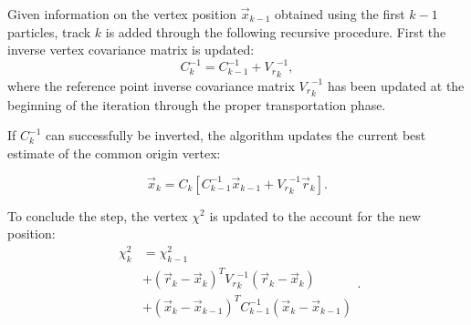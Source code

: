 Given information on the vertex position $\vec{x}_{k-1}$ obtained using the first $k-1$ particles, track $k$ is added through the following recursive procedure.
First the inverse vertex covariance matrix is updated:
\begin{equation}
C_k^{-1} = C_{k-1}^{-1} + {V_r}_k^{-1},
\end{equation}
where the reference point inverse covariance matrix ${V_r}_k^{-1}$ has been updated at the beginning of the iteration through the proper transportation phase.



If $C_k^{-1}$ can successfully be inverted, the algorithm updates the current best estimate of the common origin vertex:

\begin{equation}
\vec{x}_k = C_k \left[
	C_{k-1}^{-1} \vec{x}_{k-1}
	+ {V_r}_k^{-1} \vec{r}_k
\right].
\label{eq:VF_new_vertex_final}
\end{equation}

To conclude the step, the vertex $\chi^2$ is updated to the account for the new position:
\begin{equation}
\begin{aligned}
	\chi^2_k &= \chi^2_{k-1} \\
	&+
	{\left(\vec{r}_{k} - \vec{x}_k\right)}^T  {V_r}_k^{-1} \left(\vec{r}_{k} - \vec{x}_k \right) \\
	&+
	{\left(\vec{x}_k - \vec{x}_{k-1}\right)}^T  C_{k-1}^{-1} \left(\vec{x}_k - \vec{x}_{k-1}\right) \\
\end{aligned}.
\label{eq:VF_vertex_chi2_final}
\end{equation}

